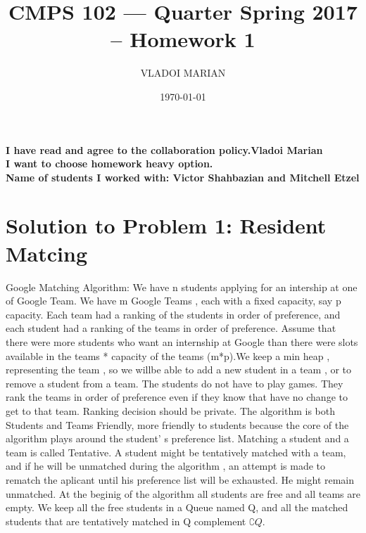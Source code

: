 \documentclass[10 pt]{article}
\title{ CMPS 102 --- Quarter  Spring 2017 --  Homework 1}
\author{VLADOI MARIAN}
\date{\today}
\begin{document}
\maketitle

\begin{center}
{\bf I have read and agree to the collaboration policy.Vladoi Marian}\\
{\bf I want to choose homework heavy option.}\\
{\bf Name of students I worked with: Victor Shahbazian and Mitchell Etzel }
\end{center}


\section*{Solution to Problem 1: Resident Matcing}
 Google Matching Algorithm:
 We have n students applying for an intership at one of Google Team.
 We have m Google Teams , each with a fixed capacity, say p capacity.
 Each team had a ranking of the students in order of preference, and each student had a ranking of the teams in order of preference.
   Assume that there were more students who want an internship at Google than there were slots available in the  teams * capacity of the teams (m*p).We keep a min heap , representing the team , so we willbe able to add a new student in a team , or to remove a student from a team.
  The students do not have to play games. They rank the teams in order of preference even if they know that have no change to get to that team.
Ranking decision should be private.
The algorithm is both Students and Teams Friendly, more friendly to students because the core of the algorithm plays around the student' s preference list. 
 Matching a student and a team is called Tentative. A student might be tentatively matched with a team, and if he will be unmatched during the algorithm , an attempt is made to rematch the aplicant until his preference list will be exhausted. He might remain unmatched.
 At the beginig of the algorithm all students are free and all teams are empty. We keep all the free students in a Queue named Q, and all the matched students that are tentatively matched in Q complement $ \complement{Q} $. 
\end{document}
